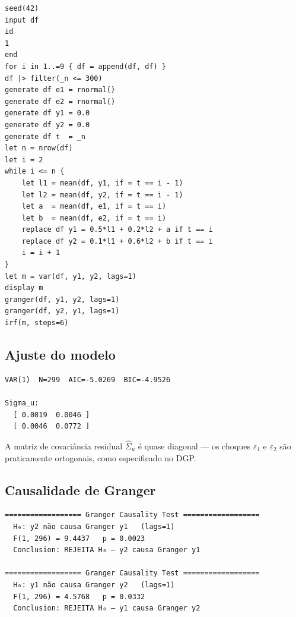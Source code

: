 \begin{lstlisting}[caption={DGP VAR(1) — Granger e IRF}]
seed(42)
input df
id
1
end
for i in 1..=9 { df = append(df, df) }
df |> filter(_n <= 300)
generate df e1 = rnormal()
generate df e2 = rnormal()
generate df y1 = 0.0
generate df y2 = 0.0
generate df t  = _n
let n = nrow(df)
let i = 2
while i <= n {
    let l1 = mean(df, y1, if = t == i - 1)
    let l2 = mean(df, y2, if = t == i - 1)
    let a  = mean(df, e1, if = t == i)
    let b  = mean(df, e2, if = t == i)
    replace df y1 = 0.5*l1 + 0.2*l2 + a if t == i
    replace df y2 = 0.1*l1 + 0.6*l2 + b if t == i
    i = i + 1
}
let m = var(df, y1, y2, lags=1)
display m
granger(df, y1, y2, lags=1)
granger(df, y2, y1, lags=1)
irf(m, steps=6)
\end{lstlisting}

\subsection*{Ajuste do modelo}

\begin{lstlisting}[language={}, basicstyle=\ttfamily\small,
  frame=none, numbers=none, backgroundcolor=\color{codbg},
  xleftmargin=0pt, xrightmargin=0pt, breaklines=false]
VAR(1)  N=299  AIC=-5.0269  BIC=-4.9526

Sigma_u:
  [ 0.0819  0.0046 ]
  [ 0.0046  0.0772 ]
\end{lstlisting}

A matriz de covariância residual $\hat\Sigma_u$ é quase diagonal — os
choques $\varepsilon_1$ e $\varepsilon_2$ são praticamente ortogonais,
como especificado no DGP.

\subsection*{Causalidade de Granger}

\begin{lstlisting}[language={}, basicstyle=\ttfamily\small,
  frame=none, numbers=none, backgroundcolor=\color{codbg},
  xleftmargin=0pt, xrightmargin=0pt, breaklines=false]
================== Granger Causality Test ==================
  H₀: y2 não causa Granger y1   (lags=1)
  F(1, 296) = 9.4437   p = 0.0023
  Conclusion: REJEITA H₀ — y2 causa Granger y1

================== Granger Causality Test ==================
  H₀: y1 não causa Granger y2   (lags=1)
  F(1, 296) = 4.5768   p = 0.0332
  Conclusion: REJEITA H₀ — y1 causa Granger y2
\end{lstlisting}


